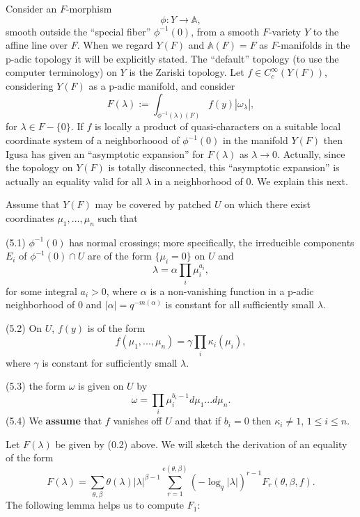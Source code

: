 \documentclass[12pt,letterpaper]{amsart}
\begin{document}
Consider an $F$-morphism
\[
\phi:Y\rightarrow {\mathbb A},
\]
smooth outside the ``special fiber'' $\phi^{-1}(0)$,
from a smooth $F$-variety $Y$ to the affine line over $F$.
When we regard $Y(F)$ and ${\mathbb A}(F)=F$ as $F$-manifolds
in the p-adic topology it will be explicitly stated.
The ``default'' topology (to use the computer terminology)
on $Y$ is the Zariski topology. Let $f\in C_c^\infty(Y(F))$,
considering $Y(F)$ as a p-adic manifold, and consider
\[
F(\lambda):=
\int_{\phi^{-1}(\lambda)(F)}f(y)|\omega_\lambda|,
\]
for $\lambda\in F-\{0\}$. If $f$ is locally a product of
quasi-characters on a suitable local coordinate system of
a neighborhoood of $\phi^{-1}(0)$ in the manifold $Y(F)$ then Igusa
has given an ``asymptotic expansion'' for $F(\lambda)$
as $\lambda\rightarrow 0$. Actually, since the topology on
$Y(F)$ is totally disconnected, this ``asymptotic expansion''
is actually an equality valid for all $\lambda$ in a neighborhood
of $0$. We explain this next.

Assume that $Y(F)$ may be covered by patched
$U$ on which there exist coordinates $\mu_1,...,\mu_n$
such that

\noindent
(5.1) $\phi^{-1}(0)$ has normal crossings; more specifically,
the irreducible components $E_i$ of $\phi^{-1}(0)\cap U$
are of the form $\{\mu_i =0\}$ on $U$ and
\[
\lambda=\alpha\prod_i\mu_i^{a_i},
\]
for some integral $a_i>0$, where $\alpha$ is a non-vanishing
function in a p-adic neighborhood of $0$ and
$|\alpha|=q^{-m(\alpha)}$ is constant for all sufficiently
small $\lambda$.

\noindent
(5.2) On $U$, $f(y)$ is of the form
\[
f(\mu_1,...,\mu_n)=\gamma \prod_i\kappa_i(\mu_i),
\]
where $\gamma$ is constant for sufficiently small $\lambda$.

\noindent
(5.3) the form $\omega$ is given on $U$ by
\[
\omega=\prod_i\mu_i^{b_i-1}d\mu_1...d\mu_n.
\]
(5.4) We \textbf{assume} that $f$ vanishes off $U$ and that if $b_i=0$ then
$\kappa_i\not= 1$, $1\leq i\leq n$.

Let $F(\lambda)$ be given by (0.2) above.
We will sketch the derivation of an equality of the form
\[
F(\lambda) =\sum_{\theta,\beta}\theta(\lambda)|\lambda|^{\beta -1}
\sum_{r=1}^{e(\theta,\beta)}(-\log_q|\lambda|)^{r-
1}F_r(\theta,\beta,f).
\tag{5.5}
\]
The following lemma helps us to compute $F_1$:
\end{document}
